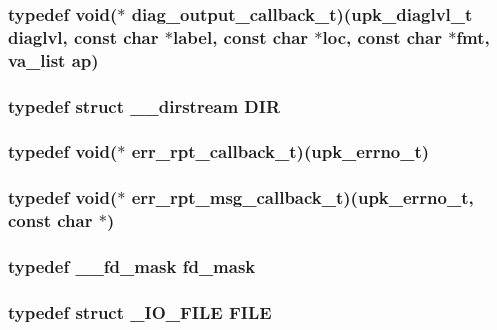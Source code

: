 \subsubsection[{diag\_\-output\_\-callback\_\-t}]{\setlength{\rightskip}{0pt plus 5cm}typedef void($\ast$ {\bf diag\_\-output\_\-callback\_\-t})({\bf upk\_\-diaglvl\_\-t} diaglvl, const char $\ast$label, const char $\ast$loc, const char $\ast$fmt, va\_\-list ap)}\label{tp_8c_a87fb65c6a60c48ba64273c389d1fba1f}
\subsubsection[{DIR}]{\setlength{\rightskip}{0pt plus 5cm}typedef struct \_\-\_\-dirstream {\bf DIR}}\label{tp_8c_a0ebe68390948c14bb9d82987adbfc849}
\subsubsection[{err\_\-rpt\_\-callback\_\-t}]{\setlength{\rightskip}{0pt plus 5cm}typedef void($\ast$ {\bf err\_\-rpt\_\-callback\_\-t})({\bf upk\_\-errno\_\-t})}\label{tp_8c_a288518a849f000cbab3a64b181b667c0}
\subsubsection[{err\_\-rpt\_\-msg\_\-callback\_\-t}]{\setlength{\rightskip}{0pt plus 5cm}typedef void($\ast$ {\bf err\_\-rpt\_\-msg\_\-callback\_\-t})({\bf upk\_\-errno\_\-t}, const char $\ast$)}\label{tp_8c_aaacf9b7f9daf89c473706185f68ff493}
\subsubsection[{fd\_\-mask}]{\setlength{\rightskip}{0pt plus 5cm}typedef {\bf \_\-\_\-fd\_\-mask} {\bf fd\_\-mask}}\label{tp_8c_a7cf0ea69614a18918b705fb4fb27ad95}
\subsubsection[{FILE}]{\setlength{\rightskip}{0pt plus 5cm}typedef struct {\bf \_\-IO\_\-FILE} {\bf FILE}}\label{tp_8c_a912af5ab9f8a52ddd387b7defc0b49f1}
